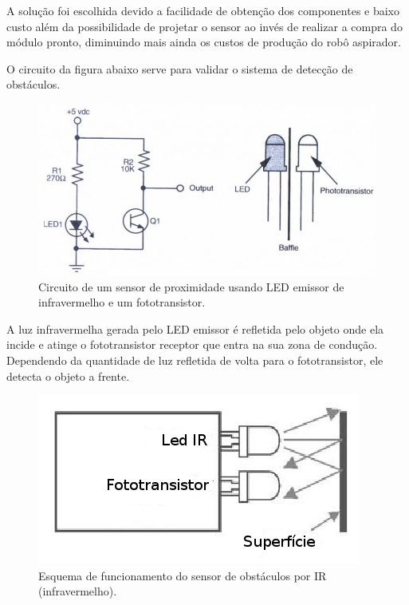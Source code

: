     A solução foi escolhida devido a facilidade de obtenção dos componentes e baixo custo além da possibilidade de projetar o sensor ao invés de realizar a compra do módulo pronto, diminuindo mais ainda os custos de produção do robô aspirador.

    O circuito da figura abaixo serve para validar o sistema de detecção de obstáculos.

    \begin{figure}[H]                                       
      \centering                                            
      \includegraphics[scale=0.3]{figuras/sensor_proximidade.png} 
      \caption{Circuito de um sensor de proximidade usando LED emissor de infravermelho e um fototransistor.}    
      \label{img:sensor_proximidade}                                
    \end{figure}                                            

    A luz infravermelha gerada pelo LED emissor é refletida pelo objeto onde ela incide e atinge o fototransistor receptor que entra na sua zona de condução. Dependendo da quantidade de luz refletida de volta para o fototransistor, ele detecta o objeto a frente. 

    \begin{figure}[H]                                                           
      \centering                                                                
      \includegraphics[scale=0.5]{figuras/funcionamento_sensor_obstaculo.png}               
      \caption{ Esquema de funcionamento do sensor de obstáculos por IR (infravermelho).}    
      \label{img:esquema_sensor_proximidade}                                            
    \end{figure}         

